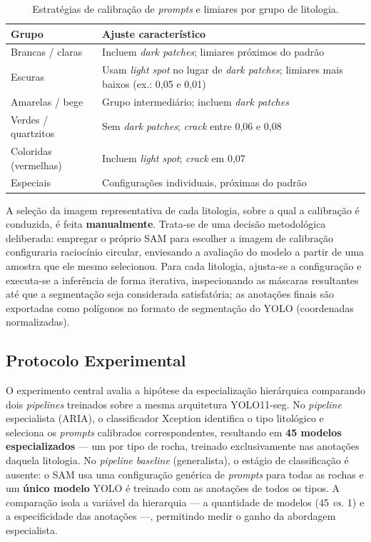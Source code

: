 \documentclass[12pt]{article}
\begin{document}
\begin{table}[ht]
\centering
\caption{Estratégias de calibração de \textit{prompts} e limiares por grupo de litologia.}
\label{tab:calibracao}
\begin{tabular}{l p{8cm}}
\hline
\textbf{Grupo} & \textbf{Ajuste característico} \\
\hline
Brancas / claras & Incluem \textit{dark patches}; limiares próximos do padrão \\
Escuras & Usam \textit{light spot} no lugar de \textit{dark patches}; limiares mais baixos (ex.: 0,05 e 0,01) \\
Amarelas / bege & Grupo intermediário; incluem \textit{dark patches} \\
Verdes / quartzitos & Sem \textit{dark patches}; \textit{crack} entre 0,06 e 0,08 \\
Coloridas (vermelhas) & Incluem \textit{light spot}; \textit{crack} em 0,07 \\
Especiais & Configurações individuais, próximas do padrão \\
\hline
\end{tabular}
\end{table}

A seleção da imagem representativa de cada litologia, sobre a qual a calibração é conduzida, é feita \textbf{manualmente}. Trata-se de uma decisão metodológica deliberada: empregar o próprio SAM para escolher a imagem de calibração configuraria raciocínio circular, enviesando a avaliação do modelo a partir de uma amostra que ele mesmo selecionou. Para cada litologia, ajusta-se a configuração e executa-se a inferência de forma iterativa, inspecionando as máscaras resultantes até que a segmentação seja considerada satisfatória; as anotações finais são exportadas como polígonos no formato de segmentação do YOLO (coordenadas normalizadas).

\subsection{Protocolo Experimental}

O experimento central avalia a hipótese da especialização hierárquica comparando dois \textit{pipelines} treinados sobre a mesma arquitetura YOLO11-seg. No \textit{pipeline} especialista (ARIA), o classificador Xception identifica o tipo litológico e seleciona os \textit{prompts} calibrados correspondentes, resultando em \textbf{45 modelos especializados} --- um por tipo de rocha, treinado exclusivamente nas anotações daquela litologia. No \textit{pipeline} \textit{baseline} (generalista), o estágio de classificação é ausente: o SAM usa uma configuração genérica de \textit{prompts} para todas as rochas e um \textbf{único modelo} YOLO é treinado com as anotações de todos os tipos. A comparação isola a variável da hierarquia --- a quantidade de modelos (45 \textit{vs.} 1) e a especificidade das anotações ---, permitindo medir o ganho da abordagem especialista.
\end{document}
